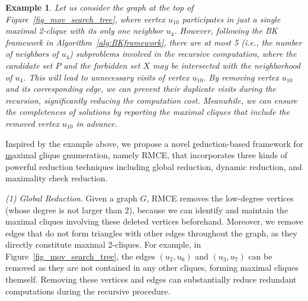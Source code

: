 \documentclass[sigconf, nonacm]{acmart}
\newtheorem{exmp}{Example}%
\newcommand{\red}[1]{{\color{red}{#1}}}
\begin{document}
\begin{exmp}
\textit{
Let us consider the graph %
at the top of Figure~\ref{fig_mov_search_tree},
where vertex  $u_{10}$ participates in just a single maximal 2-clique with its only one neighbor $u_4$.
However, following the BK framework in Algorithm~\ref{alg:BKframework}, there are at most 5 (i.e., the number of neighbors of $u_4$) subproblems involved in the recursive computation, where the candidate set $P$ and the forbidden set $X$ may be intersected with the neighborhood of $u_4$. This will lead to unnecessary visits of vertex $u_{10}$.
%
%
By removing vertex $u_{10}$ and its corresponding edge, we can prevent their duplicate visits during the recursion, 
significantly reducing the computation cost. 
Meanwhile, we can ensure the completeness of solutions by reporting the maximal cliques that include the removed vertex $u_{10}$ in advance.
}
\end{exmp}

 Inspired by the example above, we propose a novel \underline{r}eduction-based framework for \underline{m}aximal \underline{c}lique \underline{e}numeration, namely RMCE, that incorporates three kinds of powerful reduction techniques including global reduction, dynamic reduction, and maximality check reduction.

 \noindent\textit{(1) Global Reduction}.
 Given a graph $G$, RMCE removes the low-degree vertices (whose degree is not larger than 2), because we can identify and maintain the maximal cliques involving these deleted vertices beforehand. 
 Moreover, we remove edges that do not form triangles with other edges throughout the graph, as they directly constitute maximal 2-cliques. 
 For example, in %
 Figure~\ref{fig_mov_search_tree}, 
 the edges $(u_2,u_6)$ and $(u_3,u_7)$ can be removed as they are not contained in any other cliques, forming maximal cliques themself. 
 Removing these vertices and edges can substantially reduce redundant computations during %
 the recursive procedure. 
\end{document}
